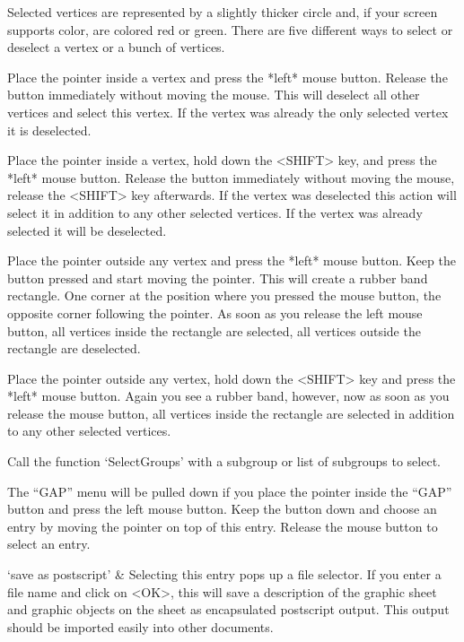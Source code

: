 Selected vertices are  represented by a slightly  thicker circle and,  if
your screen  supports color, are colored red   or green.  There  are five
different ways to select or deselect a vertex or a bunch of vertices.

Place the  pointer inside  a  vertex and press   the *left* mouse button.
Release   the button immediately   without  moving the  mouse.  This will
deselect all other vertices  and select this vertex.   If the vertex  was
already the only selected vertex it is deselected.

Place the  pointer inside a vertex, hold  down the <SHIFT> key, and press
the  *left* mouse button.   Release the button immediately without moving
the    mouse, release the   <SHIFT> key  afterwards.   If  the vertex was
deselected this action will  select it in  addition to any other selected
vertices. If the vertex was already selected it will be deselected.

Place the pointer  outside any vertex  and press the *left* mouse button.
Keep the button pressed and start moving the pointer.  This will create a
rubber band rectangle.  One corner at the position  where you pressed the
mouse button, the opposite corner following  the pointer.  As soon as you
release the left mouse button,   all  vertices inside the rectangle   are
selected, all vertices outside the rectangle are deselected.

Place the pointer outside any vertex, hold down the <SHIFT> key and press
the *left*  mouse button.  Again  you see a rubber  band, however, now as
soon as you release  the mouse button,  all vertices inside the rectangle
are selected in addition to any other selected vertices.

Call the function `SelectGroups' with a subgroup or list of subgroups to
select.


The ``GAP'' menu will  be pulled down if  you place the pointer inside  the
``GAP'' button  and press the left mouse  button.  Keep the button down and
choose an entry by moving the pointer on  top of this entry.  Release the
mouse button to select an entry.

\beginitems
`save as postscript' &
Selecting this entry pops up a file  selector.  If you  enter a file name
and click on <OK>, this will save a  description of the graphic sheet and
graphic objects on  the sheet as encapsulated postscript  output. This
output should be imported easily into other documents.

